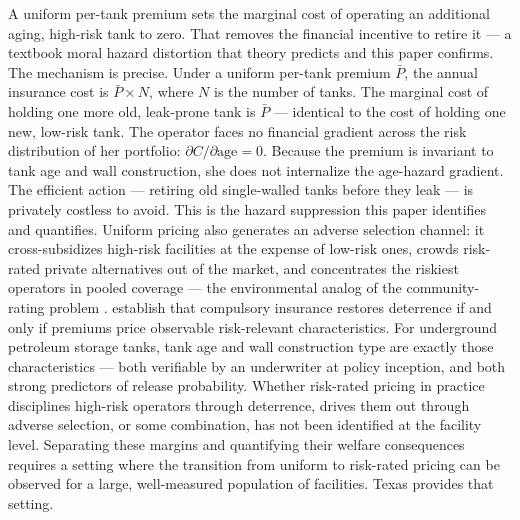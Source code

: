 \documentclass[
  12pt,
]{article}
\begin{document}
A uniform per-tank premium sets the marginal cost of operating an
additional aging, high-risk tank to zero. That removes the financial
incentive to retire it --- a textbook moral hazard distortion that
theory predicts and this paper confirms. The mechanism is precise. Under
a uniform per-tank premium \(\bar{P}\), the annual insurance cost is
\(\bar{P} \times N\), where \(N\) is the number of tanks. The marginal
cost of holding one more old, leak-prone tank is \(\bar{P}\) ---
identical to the cost of holding one new, low-risk tank. The operator
faces no financial gradient across the risk distribution of her
portfolio: \(\partial C / \partial \text{age} = 0\). Because the premium
is invariant to tank age and wall construction, she does not internalize
the age-hazard gradient. The efficient action --- retiring old
single-walled tanks before they leak --- is privately costless to avoid.
This is the hazard suppression this paper identifies and quantifies.
Uniform pricing also generates an adverse selection channel: it
cross-subsidizes high-risk facilities at the expense of low-risk ones,
crowds risk-rated private alternatives out of the market, and
concentrates the riskiest operators in pooled coverage --- the
environmental analog of the community-rating problem
\citep{pauly1974, rothschild1976}.
\citep{shavell1986, shavell2004, shavell2007} establish that compulsory
insurance restores deterrence if and only if premiums price observable
risk-relevant characteristics. For underground petroleum storage tanks,
tank age and wall construction type are exactly those characteristics
--- both verifiable by an underwriter at policy inception, and both
strong predictors of release probability. Whether risk-rated pricing in
practice disciplines high-risk operators through deterrence, drives them
out through adverse selection, or some combination, has not been
identified at the facility level. Separating these margins and
quantifying their welfare consequences requires a setting where the
transition from uniform to risk-rated pricing can be observed for a
large, well-measured population of facilities. Texas provides that
setting.
\end{document}
